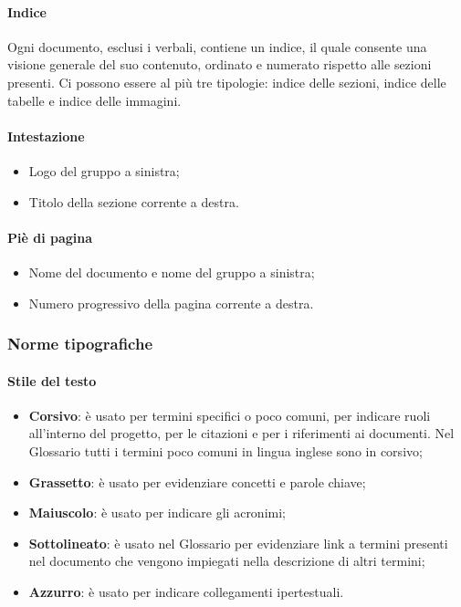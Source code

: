 \paragraph{Indice} \Spazio
Ogni documento, esclusi i verbali, contiene un indice, il quale consente una visione generale del suo contenuto, ordinato e numerato rispetto alle sezioni presenti.
Ci possono essere al più tre tipologie: indice delle sezioni, indice delle tabelle e indice delle immagini.

\paragraph{Intestazione}
\begin{itemize}
	\item Logo del gruppo a sinistra;
	\item Titolo della sezione corrente a destra.
\end{itemize}


\paragraph{Piè di pagina}
\begin{itemize}
	\item Nome del documento e nome del gruppo a sinistra;
	\item Numero progressivo della pagina corrente a destra.
\end{itemize}

\subsubsection{Norme tipografiche}
\paragraph{Stile del testo}
	\begin{itemize}
		\item \textbf{Corsivo}: è usato per termini specifici o poco comuni, per indicare ruoli all’interno del progetto, per le citazioni e per i riferimenti ai documenti. Nel Glossario tutti i termini poco comuni in lingua inglese sono in corsivo;
		\item \textbf{Grassetto}: è usato per evidenziare concetti e parole chiave;
		\item \textbf{Maiuscolo}: è usato per indicare gli acronimi;
		\item \textbf{Sottolineato}: è usato nel Glossario per evidenziare link a termini presenti nel documento che vengono impiegati nella descrizione di altri termini;
		\item \textbf{Azzurro}: è usato per indicare collegamenti ipertestuali.
	\end{itemize}
